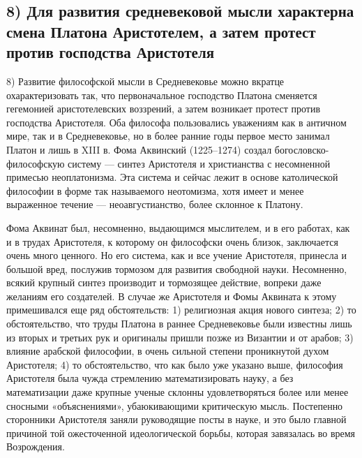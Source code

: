 \subsection{8)  Для  развития  средневековой  мысли  характерна  смена
Платона Аристотелем, а затем протест против господства Аристотеля}

8)   Развитие  философской   мысли  в   Средневековье  можно   вкратце
охарактеризовать так, что  первоначальное господство Платона сменяется
гегемонией аристотелевских воззрений, а затем возникает протест против
господства  Аристотеля.  Оба  философа пользовались  уважениям  как  в
античном  мире,  так  и  в  Средневековье,  но  в  более  ранние  годы
первое  место  занимал  Платон  и   лишь  в  XIII  в.  Фома  Аквинский
(1225--1274)   создал  богословско-философскую   систему  ---   синтез
Аристотеля и  христианства с  несомненной примесью  неоплатонизма. Эта
система и  сейчас лежит  в основе католической  философии в  форме так
называемого  неотомизма, хотя  имеет  и менее  выраженное течение  ---
неоавгустианство, более склонное к Платону.

Фома Аквинат был, несомненно, выдающимся  мыслителем, и в его работах,
как  и в  трудах Аристотеля,  к которому  он философски  очень близок,
заключается  очень много  ценного. Но  его система,  как и  все учение
Аристотеля, принесла  и большой  вред, послужив тормозом  для развития
свободной  науки.  Несомненно,  всякий  крупный  синтез  производит  и
тормозящее действие, вопреки даже желаниям его создателей. В случае же
Аристотеля и Фомы Аквината к этому примешивался еще ряд обстоятельств:
1) религиозная акция  нового синтеза; 2) то  обстоятельство, что труды
Платона  в  раннее  Средневековье  были  известны  лишь  из  вторых  и
третьих  рук и  оригиналы пришли  позже из  Византии и  от арабов;  3)
влияние арабской философии, в  очень сильной степени проникнутой духом
Аристотеля;  4) то  обстоятельство,  что как  было  уже указано  выше,
философия Аристотеля  была чужда стремлению математизировать  науку, а
без математизации  даже крупные  ученые склонны  удовлетворяться более
или  менее сносными  «объяснениями», убаюкивающими  критическую мысль.
Постепенно сторонники  Аристотеля заняли руководящие посты  в науке, и
это  было главной  причиной  той  ожесточенной идеологической  борьбы,
которая завязалась во время Возрождения.

